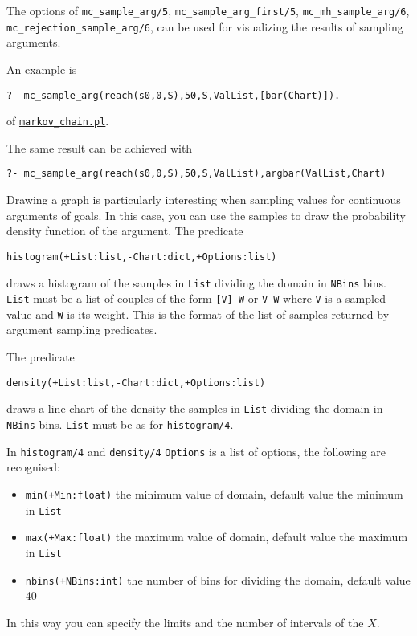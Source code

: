 The options of
\verb|mc_sample_arg/5|, \verb|mc_sample_arg_first/5|,   \verb|mc_mh_sample_arg/6|,  \verb|mc_rejection_sample_arg/6|, 
can be used for visualizing the results of sampling arguments.

An example is
\begin{verbatim}
?- mc_sample_arg(reach(s0,0,S),50,S,ValList,[bar(Chart)]).
\end{verbatim}
of \href{http://cplint.eu/example/inference/markov_chain.pl}{\texttt{markov\_chain.pl}}.

The same result can be achieved with
\begin{verbatim}
?- mc_sample_arg(reach(s0,0,S),50,S,ValList),argbar(ValList,Chart)
\end{verbatim}
Drawing a graph is particularly interesting when
sampling values for continuous arguments of goals.
In this case, you can use the samples to draw the
probability density function of the argument.
The predicate
\begin{verbatim}
histogram(+List:list,-Chart:dict,+Options:list)
\end{verbatim}
draws a histogram of the samples in \verb|List| dividing the domain in
 \verb|NBins| bins.
\verb|List| must be a list of couples of the form \verb|[V]-W| or  \verb|V-W|
where \verb|V| is a sampled value and \verb|W| is its weight. This is the format of the list of samples returned by argument sampling predicates.

The predicate
\begin{verbatim}
density(+List:list,-Chart:dict,+Options:list)
\end{verbatim}
draws a line chart of the density the samples in \verb|List| dividing the domain in
 \verb|NBins| bins.
\verb|List| must be as for \verb|histogram/4|.

In  \verb|histogram/4| and  \verb|density/4| \verb|Options| is a list of options, the following are recognised: \begin{itemize}
\item \verb|min(+Min:float)|
the minimum value of domain, default value the minimum in \verb|List|
\item \verb|max(+Max:float)|
the maximum value of domain, default value the maximum in  \verb|List|
\item \verb|nbins(+NBins:int)|
  the number of bins for dividing the domain, default value 40
\end{itemize}
In this way you can specify the limits and the number of intervals of the $X$.


